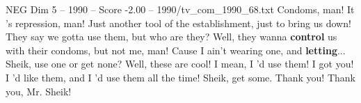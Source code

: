 \begin{textsample}{NEG Dim 5 – 1990 – Score -2.00 – 1990/tv\_com\_1990\_68.txt}  \label{ex:f5_neg_073}
Condoms, man!
It 's repression, man!
Just another tool of the establishment, just to bring us down!
They say we gotta use them, but who are they?
Well, they wanna \textbf{control} us with their condoms, but not me, man!
Cause I ain't wearing one, and \textbf{letting}...
Sheik, use one or get none?
Well, these are cool!
I mean, I 'd use them!
I got you!
I 'd like them, and I 'd use them all the time!
Sheik, get some.
Thank you!
Thank you, Mr.
Sheik!

\end{textsample}

